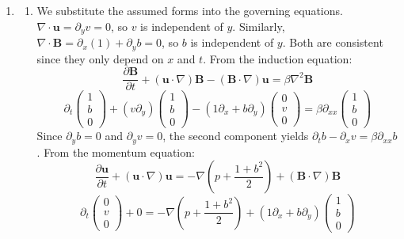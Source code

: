 \documentclass{article}
\begin{document}
\begin{enumerate}[label=\fbox{\arabic*}]
  \item %
        \begin{enumerate}[label=(\arabic*)]
          \item We substitute the assumed forms into the governing equations. 
          $\nabla \cdot \boldsymbol{u} = \partial_y v = 0$, so $v$ is independent of $y$. Similarly, $\nabla \cdot \boldsymbol{B} = \partial_x (1) + \partial_y b = 0$, so $b$ is independent of $y$. Both are consistent since they only depend on $x$ and $t$.
          From the induction equation:
          \[
            \frac{\partial \boldsymbol{B}}{\partial t} + (\boldsymbol{u} \cdot \nabla) \boldsymbol{B} - (\boldsymbol{B} \cdot \nabla) \boldsymbol{u} = \beta \nabla^2 \boldsymbol{B}
          \]
          \[
            \partial_t \begin{pmatrix} 1 \\ b \\ 0 \end{pmatrix} + \left(v \partial_y\right) \begin{pmatrix} 1 \\ b \\ 0 \end{pmatrix} - \left(1 \partial_x + b \partial_y\right) \begin{pmatrix} 0 \\ v \\ 0 \end{pmatrix} = \beta \partial_{xx} \begin{pmatrix} 1 \\ b \\ 0 \end{pmatrix}
          \]
          Since $\partial_y b = 0$ and $\partial_y v = 0$, the second component yields $\partial_t b - \partial_x v = \beta \partial_{xx} b$.
          From the momentum equation:
          \[
            \frac{\partial \boldsymbol{u}}{\partial t} + (\boldsymbol{u} \cdot \nabla) \boldsymbol{u} = -\nabla \left( p + \frac{1+b^2}{2} \right) + (\boldsymbol{B} \cdot \nabla) \boldsymbol{B}
          \]
          \[
            \partial_t \begin{pmatrix} 0 \\ v \\ 0 \end{pmatrix} + 0 = -\nabla \left( p + \frac{1+b^2}{2} \right) + \left(1 \partial_x + b \partial_y\right) \begin{pmatrix} 1 \\ b \\ 0 \end{pmatrix}
\]
\end{enumerate}
\end{enumerate}
\end{document}
